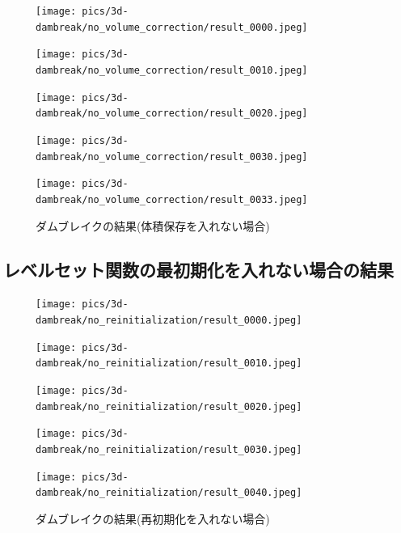 \begin{figure}[H]
	\centering
	\begin{minipage}[b]{0.19\columnwidth}
	    \centering
	    \texttt{[image: pics/3d-dambreak/no\_volume\_correction/result\_0000.jpeg]}
	\end{minipage}
	\begin{minipage}[b]{0.19\columnwidth}
	    \centering
	    \texttt{[image: pics/3d-dambreak/no\_volume\_correction/result\_0010.jpeg]}
	\end{minipage}
	\begin{minipage}[b]{0.19\columnwidth}
	    \centering
	    \texttt{[image: pics/3d-dambreak/no\_volume\_correction/result\_0020.jpeg]}
	\end{minipage}
	\begin{minipage}[b]{0.19\columnwidth}
	    \centering
	    \texttt{[image: pics/3d-dambreak/no\_volume\_correction/result\_0030.jpeg]}
	\end{minipage}
	\begin{minipage}[b]{0.19\columnwidth}
	    \centering
	    \texttt{[image: pics/3d-dambreak/no\_volume\_correction/result\_0033.jpeg]}
	\end{minipage}

	\caption{ダムブレイクの結果(体積保存を入れない場合)}
	\label{fig:dambreak-result}
\end{figure}


\subsection{レベルセット関数の最初期化を入れない場合の結果}

\begin{figure}[H]
	\centering
	\begin{minipage}[b]{0.19\columnwidth}
	    \centering
	    \texttt{[image: pics/3d-dambreak/no\_reinitialization/result\_0000.jpeg]}
	\end{minipage}
	\begin{minipage}[b]{0.19\columnwidth}
	    \centering
	    \texttt{[image: pics/3d-dambreak/no\_reinitialization/result\_0010.jpeg]}
	\end{minipage}
	\begin{minipage}[b]{0.19\columnwidth}
	    \centering
	    \texttt{[image: pics/3d-dambreak/no\_reinitialization/result\_0020.jpeg]}
	\end{minipage}
	\begin{minipage}[b]{0.19\columnwidth}
	    \centering
	    \texttt{[image: pics/3d-dambreak/no\_reinitialization/result\_0030.jpeg]}
	\end{minipage}
	\begin{minipage}[b]{0.19\columnwidth}
	    \centering
	    \texttt{[image: pics/3d-dambreak/no\_reinitialization/result\_0040.jpeg]}
	\end{minipage}

	\caption{ダムブレイクの結果(再初期化を入れない場合)}
	\label{fig:dambreak-result}
\end{figure}


